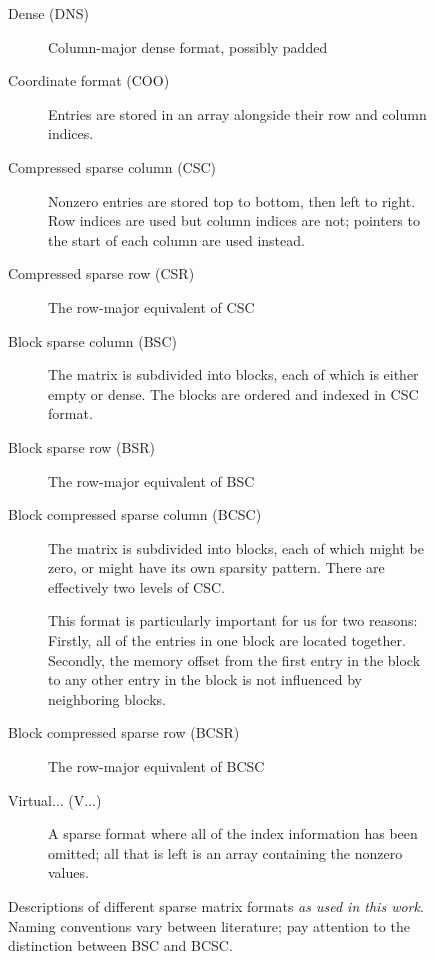 \begin{figure}

\begin{description}
	\item[Dense (DNS)] Column-major dense format, possibly padded

	\item[Coordinate format (COO)] Entries are stored in an array alongside their row and column indices.

	\item[Compressed sparse column (CSC)] Nonzero entries are stored top to bottom, then left to right. Row indices are used but column indices are not; pointers to the start of each column are used instead. 

	\item[Compressed sparse row (CSR)] The row-major equivalent of CSC

	\item[Block sparse column (BSC)] The matrix is subdivided into blocks, each of which is either empty or dense. The blocks are ordered and indexed in CSC format. 

	\item[Block sparse row (BSR)] The row-major equivalent of BSC

	\item[Block compressed sparse column (BCSC)] The matrix is subdivided into blocks, each of which might be zero, or might have its own sparsity pattern. There are effectively two levels of CSC. 

	This format is particularly important for us for two reasons: Firstly, all of the entries in one block are located together. Secondly, the memory offset from the first entry in the block to any other entry in the block is not influenced by neighboring blocks. 

	\item[Block compressed sparse row (BCSR)] The row-major equivalent of BCSC

	\item[Virtual... (V...)] A sparse format where all of the index information has been omitted; all that is left is an array containing the nonzero values.

\end{description}
\caption{Descriptions of different sparse matrix formats \emph{as used in this work}. Naming conventions vary between literature; pay attention to the distinction between BSC and BCSC. }
\label{fig:formats}
\end{figure}


